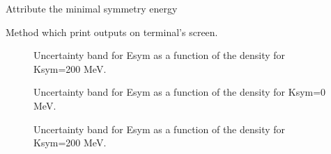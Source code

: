 \documentclass[letterpaper,10pt,english]{sphinxmanual}
\begin{document}
\begin{fulllineitems}

\begin{fulllineitems}
\label{\detokenize{source/api/setup_eos_esym:nucleardatapy.setup_eos_esym.SetupEOSEsym.esym_e2a_min}}
\pysigstartsignatures
\pysigline
{}
\pysigstopsignatures
\sphinxAtStartPar
Attribute the minimal symmetry energy

\end{fulllineitems}


\begin{fulllineitems}
\label{\detokenize{source/api/setup_eos_esym:nucleardatapy.setup_eos_esym.SetupEOSEsym.print_outputs}}
\pysigstartsignatures
\pysiglinewithargsret
{}
{}
{}
\pysigstopsignatures
\sphinxAtStartPar
Method which print outputs on terminal’s screen.

\end{fulllineitems}


\end{fulllineitems}


\begin{figure}[htbp]
\centering
\capstart

\noindent{}
\caption{Uncertainty band for Esym as a function of the density for Ksym=\sphinxhyphen{}200 MeV.}\label{\detokenize{source/api/setup_eos_esym:id1}}\end{figure}

\begin{figure}[htbp]
\centering
\capstart

\noindent{}
\caption{Uncertainty band for Esym as a function of the density for Ksym=0 MeV.}\label{\detokenize{source/api/setup_eos_esym:id2}}\end{figure}

\begin{figure}[htbp]
\centering
\capstart

\noindent{}
\caption{Uncertainty band for Esym as a function of the density for Ksym=200 MeV.}\label{\detokenize{source/api/setup_eos_esym:id3}}\end{figure}
\end{document}
